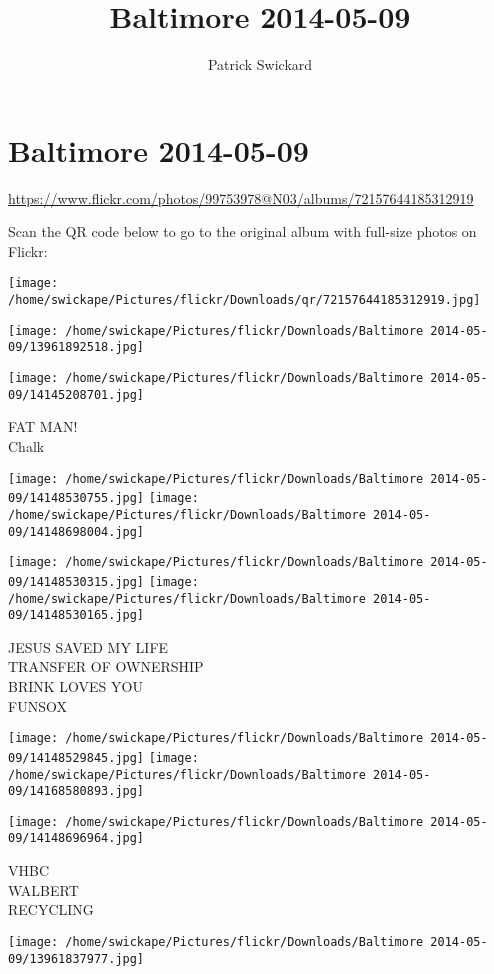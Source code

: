 \documentclass[10pt,letterpaper]{article}
\title{Baltimore 2014-05-09}
\author{Patrick Swickard}
\date{}
\begin{document}
\section*{Baltimore 2014-05-09}

\url{https://www.flickr.com/photos/99753978@N03/albums/72157644185312919}

Scan the QR code below to go to the original album with full-size photos on Flickr:

\texttt{[image: /home/swickape/Pictures/flickr/Downloads/qr/72157644185312919.jpg]}
\pagebreak

\texttt{[image: /home/swickape/Pictures/flickr/Downloads/Baltimore 2014-05-09/13961892518.jpg]}

\vspace{0.25in}
\texttt{[image: /home/swickape/Pictures/flickr/Downloads/Baltimore 2014-05-09/14145208701.jpg]}

FAT MAN!\\
Chalk
\pagebreak

\texttt{[image: /home/swickape/Pictures/flickr/Downloads/Baltimore 2014-05-09/14148530755.jpg]}
\texttt{[image: /home/swickape/Pictures/flickr/Downloads/Baltimore 2014-05-09/14148698004.jpg]}

\texttt{[image: /home/swickape/Pictures/flickr/Downloads/Baltimore 2014-05-09/14148530315.jpg]}
\texttt{[image: /home/swickape/Pictures/flickr/Downloads/Baltimore 2014-05-09/14148530165.jpg]}

JESUS SAVED MY LIFE\\
TRANSFER OF OWNERSHIP\\
BRINK LOVES YOU\\
FUNSOX
\pagebreak

\texttt{[image: /home/swickape/Pictures/flickr/Downloads/Baltimore 2014-05-09/14148529845.jpg]}
\texttt{[image: /home/swickape/Pictures/flickr/Downloads/Baltimore 2014-05-09/14168580893.jpg]}

\texttt{[image: /home/swickape/Pictures/flickr/Downloads/Baltimore 2014-05-09/14148696964.jpg]}

VHBC\\
WALBERT\\
RECYCLING
\pagebreak

\texttt{[image: /home/swickape/Pictures/flickr/Downloads/Baltimore 2014-05-09/13961837977.jpg]}
\end{document}
